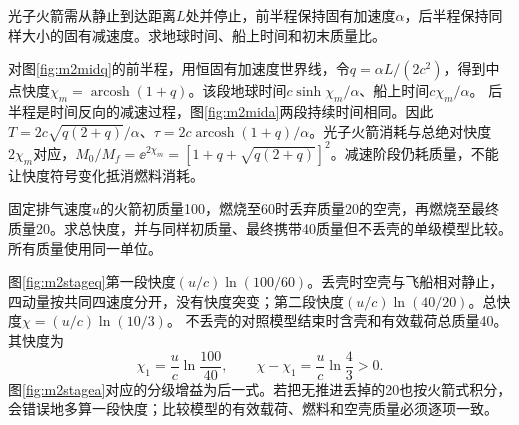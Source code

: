 \begin{exercise}\label{ex:m2midburn}
光子火箭需从静止到达距离$L$处并停止，前半程保持固有加速度$\alpha$，后半程保持同样大小的固有减速度。求地球时间、船上时间和初末质量比。
\end{exercise}
\begin{solution}
对图\ref{fig:m2midq}的前半程，用恒固有加速度世界线，令$q=\alpha L/(2c^2)$，得到中点快度$\chi_m=\operatorname{arcosh}(1+q)$。该段地球时间$c\sinh\chi_m/\alpha$、船上时间$c\chi_m/\alpha$。
后半程是时间反向的减速过程，图\ref{fig:m2mida}两段持续时间相同。因此$T=2c\sqrt{q(2+q)}/\alpha$、$\tau=2c\operatorname{arcosh}(1+q)/\alpha$。光子火箭消耗与总绝对快度$2\chi_m$对应，$M_0/M_f=\ee^{2\chi_m}=[1+q+\sqrt{q(2+q)}]^2$。减速阶段仍耗质量，不能让快度符号变化抵消燃料消耗。
\end{solution}

\begin{exercise}\label{ex:m2staging}
固定排气速度$u$的火箭初质量100，燃烧至60时丢弃质量20的空壳，再燃烧至最终质量20。求总快度，并与同样初质量、最终携带40质量但不丢壳的单级模型比较。所有质量使用同一单位。
\end{exercise}
\begin{solution}
图\ref{fig:m2stageq}第一段快度$(u/c)\ln(100/60)$。丢壳时空壳与飞船相对静止，四动量按共同四速度分开，没有快度突变；第二段快度$(u/c)\ln(40/20)$。总快度$\chi=(u/c)\ln(10/3)$。
不丢壳的对照模型结束时含壳和有效载荷总质量40。其快度为
\[
 \chi_1=\frac uc\ln\frac{100}{40},\qquad
 \chi-\chi_1=\frac uc\ln\frac43>0.
\]
图\ref{fig:m2stagea}对应的分级增益为后一式。若把无推进丢掉的20也按火箭式积分，会错误地多算一段快度；比较模型的有效载荷、燃料和空壳质量必须逐项一致。
\end{solution}

